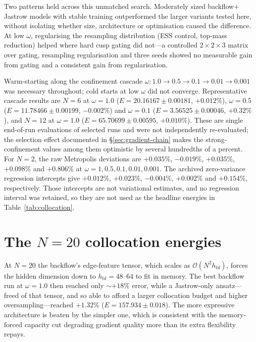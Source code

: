 Two patterns held across this unmatched search. Moderately sized backflow$+$Jastrow models
with stable training outperformed the larger variants tested here, without isolating whether
size, architecture or optimisation caused the difference. At low $\omega$, regularising the resampling
distribution (ESS control, top-mass reduction) helped where hard cusp gating did not---a
controlled $2{\times}2{\times}3$ matrix over gating, resampling regularisation and three
seeds showed no measurable gain from gating and a consistent gain from regularisation.

Warm-starting along the confinement cascade
$\omega:1.0\!\to\!0.5\!\to\!0.1\!\to\!0.01\!\to\!0.001$ was necessary throughout; cold starts
at low $\omega$ did not converge. Representative cascade results are $N{=}6$ at
$\omega{=}1.0$ ($E=20.16167\pm0.00181$, $+0.012\%$), $\omega{=}0.5$
($E=11.78466\pm0.00199$, $-0.002\%$) and $\omega{=}0.1$ ($E=3.56525\pm0.00046$, $+0.32\%$),
and $N{=}12$ at $\omega{=}1.0$ ($E=65.70699\pm0.00595$, $+0.010\%$). These are single
end-of-run evaluations of selected runs and were not independently re-evaluated; the
selection effect documented in \S\ref{sec:gradient-chain} makes the strong-confinement values
among them optimistic by several hundredths of a percent. For $N{=}2$, the raw Metropolis
deviations are $+0.035\%$, $-0.019\%$, $+0.035\%$, $+0.098\%$ and $+0.806\%$ at
$\omega=1,0.5,0.1,0.01,0.001$. The archived zero-variance regression intercepts give
$+0.012\%$, $+0.023\%$, $-0.004\%$, $+0.002\%$ and $+0.154\%$, respectively. Those
intercepts are not variational estimates, and no regression interval was retained, so they
are not used as the headline energies in Table~\ref{tab:collocation}.

\section{The $N=20$ collocation energies}
\label{app:postcatch22:frontier}

At $N{=}20$ the backflow's edge-feature tensor, which scales as
$\mathcal{O}(N^2 h_{\mathrm{bf}})$, forces the hidden dimension down to
$h_{\mathrm{bf}}{=}48$--$64$ to fit in memory. The best backflow run at $\omega{=}1.0$ then
reached only ${\sim}{+}18\%$ error, while a Jastrow-only ansatz---freed of that tensor, and
so able to afford a larger collocation budget and higher oversampling---reached $+1.32\%$
($E=157.934\pm0.018$). The more expressive architecture is beaten by the simpler one, which
is consistent with the memory-forced capacity cut degrading gradient quality more than its
extra flexibility repays.

